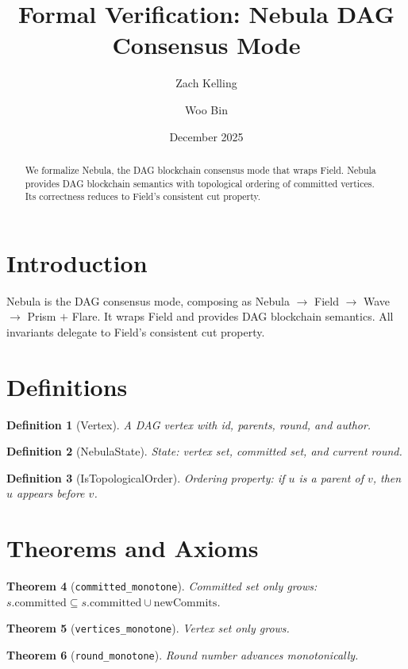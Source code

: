 \documentclass[11pt]{article}
\title{Formal Verification: Nebula DAG Consensus Mode}
\author{Zach Kelling \and Woo Bin}
\date{December 2025}
\newtheorem{theorem}{Theorem}
\newtheorem{definition}[theorem]{Definition}
\begin{document}
\maketitle

\begin{abstract}
We formalize Nebula, the DAG blockchain consensus mode that wraps Field. Nebula provides DAG blockchain semantics with topological ordering of committed vertices. Its correctness reduces to Field's consistent cut property.
\end{abstract}

\section{Introduction}
Nebula is the DAG consensus mode, composing as Nebula $\to$ Field $\to$ Wave $\to$ Prism $+$ Flare. It wraps Field and provides DAG blockchain semantics. All invariants delegate to Field's consistent cut property.

\section{Definitions}
\begin{definition}[Vertex]
A DAG vertex with id, parents, round, and author.
\end{definition}

\begin{definition}[NebulaState]
State: vertex set, committed set, and current round.
\end{definition}

\begin{definition}[IsTopologicalOrder]
Ordering property: if $u$ is a parent of $v$, then $u$ appears before $v$.
\end{definition}


\section{Theorems and Axioms}
\begin{theorem}[\texttt{committed\_monotone}]
Committed set only grows: $s.\text{committed} \subseteq s.\text{committed} \cup \text{newCommits}$.
\end{theorem}

\begin{theorem}[\texttt{vertices\_monotone}]
Vertex set only grows.
\end{theorem}

\begin{theorem}[\texttt{round\_monotone}]
Round number advances monotonically.
\end{theorem}
\end{document}
